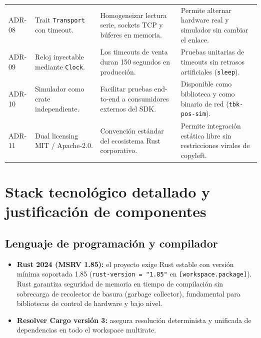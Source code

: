 \documentclass{../../plantilla/raysac-informe}
\begin{document}
\begin{longtable}{@{}p{1.4cm}p{4.0cm}p{4.2cm}p{4.8cm}@{}}
ADR-08 & Trait \texttt{Transport} con timeout. & Homogeneizar lectura serie, sockets TCP y búferes en memoria. & Permite alternar hardware real y simulador sin cambiar el enlace. \\
ADR-09 & Reloj inyectable mediante \texttt{Clock}. & Los timeouts de venta duran 150 segundos en producción. & Pruebas unitarias de timeouts sin retrasos artificiales (\texttt{sleep}). \\
ADR-10 & Simulador como crate independiente. & Facilitar pruebas end-to-end a consumidores externos del SDK. & Disponible como biblioteca y como binario de red (\texttt{tbk-pos-sim}). \\
ADR-11 & Dual licensing MIT / Apache-2.0. & Convención estándar del ecosistema Rust corporativo. & Permite integración estática libre sin restricciones virales de copyleft. \\
\end{longtable}

\clearpage
\section{Stack tecnológico detallado y justificación de componentes}

\subsection{Lenguaje de programación y compilador}
\begin{itemize}
  \item \textbf{Rust 2024 (MSRV 1.85):} el proyecto exige Rust estable con versión mínima soportada 1.85
    (\texttt{rust-version = "1.85"} en \texttt{[workspace.package]}). Rust garantiza seguridad de memoria en tiempo
    de compilación sin sobrecarga de recolector de basura (garbage collector), fundamental para bibliotecas
    de control de hardware y bajo nivel.
  \item \textbf{Resolver Cargo versión 3:} asegura resolución determinista y unificada de dependencias en
    todo el workspace multirate.
\end{itemize}
\end{document}
